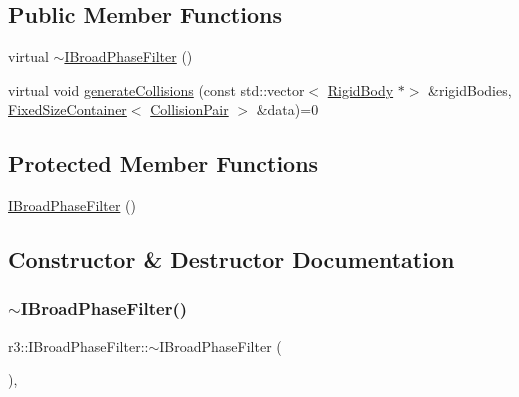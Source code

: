 \subsection*{Public Member Functions}
\begin{DoxyCompactItemize}
\item 
virtual \mbox{\hyperlink{classr3_1_1_i_broad_phase_filter_af6cd5cfcf4487d97916debae0011244f}{$\sim$\+I\+Broad\+Phase\+Filter}} ()
\item 
virtual void \mbox{\hyperlink{classr3_1_1_i_broad_phase_filter_a5f437f6390a8f10bf96d72e35e3b4432}{generate\+Collisions}} (const std\+::vector$<$ \mbox{\hyperlink{classr3_1_1_rigid_body}{Rigid\+Body}} $\ast$$>$ \&rigid\+Bodies, \mbox{\hyperlink{classr3_1_1_fixed_size_container}{Fixed\+Size\+Container}}$<$ \mbox{\hyperlink{classr3_1_1_collision_pair}{Collision\+Pair}} $>$ \&data)=0
\end{DoxyCompactItemize}
\subsection*{Protected Member Functions}
\begin{DoxyCompactItemize}
\item 
\mbox{\hyperlink{classr3_1_1_i_broad_phase_filter_ab1eb5dc44548078aa0716eedbab8ac11}{I\+Broad\+Phase\+Filter}} ()
\end{DoxyCompactItemize}


\subsection{Constructor \& Destructor Documentation}
\mbox{\label{classr3_1_1_i_broad_phase_filter_af6cd5cfcf4487d97916debae0011244f}} 
\subsubsection{\texorpdfstring{$\sim$\+I\+Broad\+Phase\+Filter()}{~IBroadPhaseFilter()}}
{\footnotesize\ttfamily r3\+::\+I\+Broad\+Phase\+Filter\+::$\sim$\+I\+Broad\+Phase\+Filter (\begin{DoxyParamCaption}{ }\end{DoxyParamCaption})\hspace{0.3cm}{\ttfamily [virtual]}, {\ttfamily [default]}}

